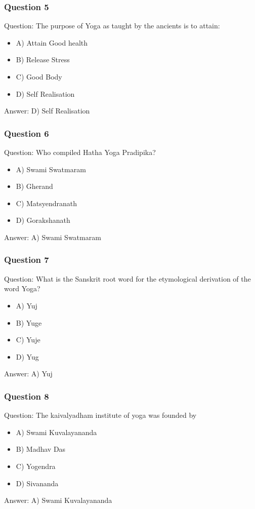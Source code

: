 \begin{frame}[fragile]\frametitle{Question 5}
Question: The purpose of Yoga as taught by the ancients is to attain:
\begin{itemize}
\item A) Attain Good health
\item B) Release Stress
\item C) Good Body
\item D) Self Realisation
\end{itemize}
Answer: D) Self Realisation
\end{frame}

\begin{frame}[fragile]\frametitle{Question 6}
Question: Who compiled Hatha Yoga Pradipika?
\begin{itemize}
\item A) Swami Swatmaram
\item B) Gherand
\item C) Matsyendranath
\item D) Gorakshanath
\end{itemize}
Answer: A) Swami Swatmaram
\end{frame}

\begin{frame}[fragile]\frametitle{Question 7}
Question: What is the Sanskrit root word for the etymological derivation of the word Yoga?
\begin{itemize}
\item A) Yuj
\item B) Yuge
\item C) Yuje
\item D) Yug
\end{itemize}
Answer: A) Yuj
\end{frame}

\begin{frame}[fragile]\frametitle{Question 8}
Question: The kaivalyadham institute of yoga was founded by
\begin{itemize}
\item A) Swami Kuvalayananda
\item B) Madhav Das
\item C) Yogendra
\item D) Sivananda
\end{itemize}
Answer: A) Swami Kuvalayananda
\end{frame}


